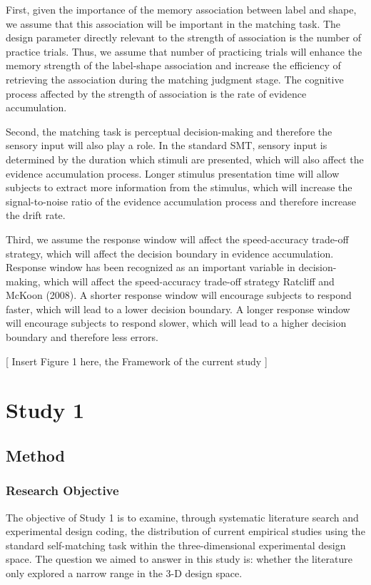 \documentclass[
  english,
  man,floatsintext]{apa6}
\begin{document}
First, given the importance of the memory association between label and shape, we assume that this association will be important in the matching task. The design parameter directly relevant to the strength of association is the number of practice trials. Thus, we assume that number of practicing trials will enhance the memory strength of the label-shape association and increase the efficiency of retrieving the association during the matching judgment stage. The cognitive process affected by the strength of association is the rate of evidence accumulation.

Second, the matching task is perceptual decision-making and therefore the sensory input will also play a role. In the standard SMT, sensory input is determined by the duration which stimuli are presented, which will also affect the evidence accumulation process. Longer stimulus presentation time will allow subjects to extract more information from the stimulus, which will increase the signal-to-noise ratio of the evidence accumulation process and therefore increase the drift rate.

Third, we assume the response window will affect the speed-accuracy trade-off strategy, which will affect the decision boundary in evidence accumulation. Response window has been recognized as an important variable in decision-making, which will affect the speed-accuracy trade-off strategy Ratcliff and McKoon (2008). A shorter response window will encourage subjects to respond faster, which will lead to a lower decision boundary. A longer response window will encourage subjects to respond slower, which will lead to a higher decision boundary and therefore less errors.

{[} Insert Figure 1 here, the Framework of the current study {]}

\section{Study 1}\label{study-1}

\subsection{Method}\label{method}

\subsubsection{Research Objective}\label{research-objective}

The objective of Study 1 is to examine, through systematic literature search and experimental design coding, the distribution of current empirical studies using the standard self-matching task within the three-dimensional experimental design space. The question we aimed to answer in this study is: whether the literature only explored a narrow range in the 3-D design space.
\end{document}

